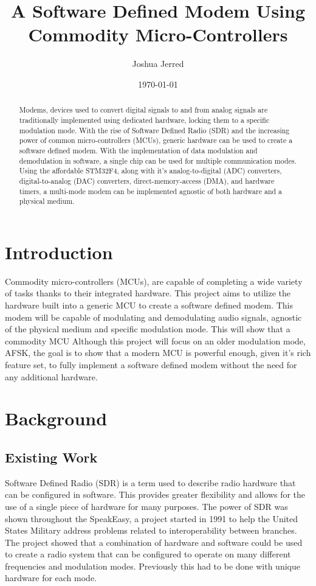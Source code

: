 \documentclass[notitlepage]{report}
\title{A Software Defined Modem Using Commodity Micro-Controllers}
\author{Joshua Jerred}
\date{\today}
\begin{document}
\maketitle

\begin{abstract}
  Modems, devices used to convert digital signals to and from analog signals are traditionally implemented using dedicated hardware, locking them to a specific modulation mode. With the rise of Software Defined Radio (SDR) and the increasing power of common micro-controllers (MCUs), generic hardware can be used to create a software defined modem. With the implementation of data modulation and demodulation in software, a single chip can be used for multiple communication modes. Using the affordable STM32F4, along with it's analog-to-digital (ADC) converters, digital-to-analog (DAC) converters, direct-memory-access (DMA), and hardware timers, a multi-mode modem can be implemented agnostic of both hardware and a physical medium.
\end{abstract}

\section{Introduction}

Commodity micro-controllers (MCUs), are capable of completing a wide variety of tasks thanks to their integrated hardware. This project aims to utilize the hardware built into a generic MCU to create a software defined modem. This modem will be capable of modulating and demodulating audio signals, agnostic of the physical medium and specific modulation mode. This will show that a commodity MCU  Although this project will focus on an older modulation mode, AFSK, the goal is to show that a modern MCU is powerful enough, given it's rich feature set, to fully implement a software defined modem without the need for any additional hardware.

\section{Background}

\subsection{Existing Work}

Software Defined Radio (SDR) is a term used to describe radio hardware that can be configured in software. This provides greater flexibility and allows for the use of a single piece of hardware for many purposes. The power of SDR was shown throughout the SpeakEasy, a project started in 1991 to help the United States Military address problems related to interoperability between branches\cite{speakeasy}. The project showed that a combination of hardware and software could be used to create a radio system that can be configured to operate on many different frequencies and modulation modes. Previously this had to be done with unique hardware for each mode.
\end{document}
